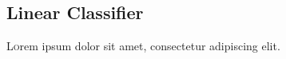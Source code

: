 \subsection{Linear Classifier}

\lettrine[nindent=0em,lines=3]{L} orem ipsum dolor sit amet, consectetur adipiscing elit.
\lipsum[2] %

